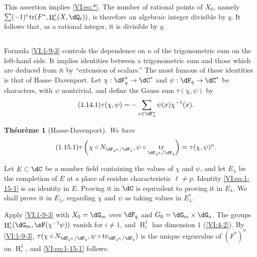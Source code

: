 \documentclass[oneside]{book}
\DeclareMathOperator{\h}{H}
\DeclareMathOperator{\tr}{tr}
\newcounter{char}
\theoremstyle{sga-source}
\theoremstyle{sga-source-dash}
\theoremstyle{sga-source-dotdash}
\theoremstyle{sga-source-number-note-dash}
\theoremstyle{sga-source-note-number-dotdash}
\theoremstyle{sga-source-example-dotdash}
\theoremstyle{sga-source-inline-number}
\theoremstyle{sga-source-bare-number}
\theoremstyle{sga-source}
\newtheorem{theorem_}[subsection]{Théorème}
\newcommand{\PrintPage}[1]{}\newcommand{\MathPage}[1]{}\newcommand{\PrintCite}[2]{#1}\newcommand{\var}[3]{#2}
\begin{document}
This assertion implies \eqref{VI:eq:*}. The number of rational points of 
$X_0$, namely $\var{\sum (-1)^i \tr(F^\ast,\h^i(X,\dQ_\ell))}{\sum (-1)^i \tr(F^\ast,\h_c^i(X,\dQ_\ell))}{S45-SOL-0697}$, is therefore an 
algebraic integer divisible by $q$. It follows that, as a rational integer, 
it is divisible by $q$. 





\PrintPage{177}
\subsection{}\label{VI:1-14}

Formula \ref{VI:1-9-3} controls the dependence on $n$ of the trigonometric 
sum on the left-hand side. It implies identities between a 
trigonometric sum and those which are deduced from it by ``extension of 
scalars.'' The most famous of these identities is that of 
Hasse--Davenport. Let $\chi:\dF_q^\ast \to \dC^\ast$ and 
$\psi:\dF_q\to \dC^\ast$ be characters, with $\psi$ nontrivial, and 
define the Gauss sum $\tau(\chi,\psi)$ by 
\begin{equation*}\tag{1.14.1}\label{VI:eq:1-14-1}
  \tau(\chi,\psi) = - \sum_{x\in \dF_q^\ast} \psi(x) \chi^{-1}(x) \text{.}
\end{equation*}





\begin{theorem_}[Hasse-Davenport]\label{VI:1-15}
We have 
\begin{equation*}\tag{1.15.1}\label{VI:eq:1-15-1}
  \tau\left(\chi\circ N_{\dF_{q^n}/\dF_q},\psi\circ \tr_{\dF_{q^n}/\dF_q}\right) = \tau(\chi,\psi)^n \text{.}
\end{equation*}
\end{theorem_}

Let $E\subset \dC$ be a number field containing the values of $\chi$ and 
$\psi$, and let $E_\lambda$ be the completion of $E$ at a place of residue 
characteristic $\ell\ne p$. Identity \eqref{VI:eq:1-15-1} is an identity in 
$E$. Proving it in $\dC$ is equivalent to proving it in $E_\lambda$. We 
shall prove it in $E_\lambda$, regarding $\chi$ and $\psi$ as taking values 
in $E_\lambda^\ast$.

Apply \ref{VI:1-9-3} with $X_0=\dG_m$ over $\dF_q$ and 
$G_0=\dG_m\times \dG_a$. The groups $\h_c^i(\dG_m,\sF(\chi^{-1}\psi))$ vanish for 
$i\ne 1$, and $\h_c^1$ has dimension $1$ (\ref{VI:4-2}). By 
\ref{VI:1-9-3}, 
$\tau(\chi\circ N_{\dF_{q^n}/\dF_q},\psi\circ \tr_{\dF_{q^n}/\dF_q})$ is 
the unique eigenvalue of $(F^\ast)^n$ on $\h_c^1$, and \eqref{VI:eq:1-15-1} 
follows. 
\end{document}
